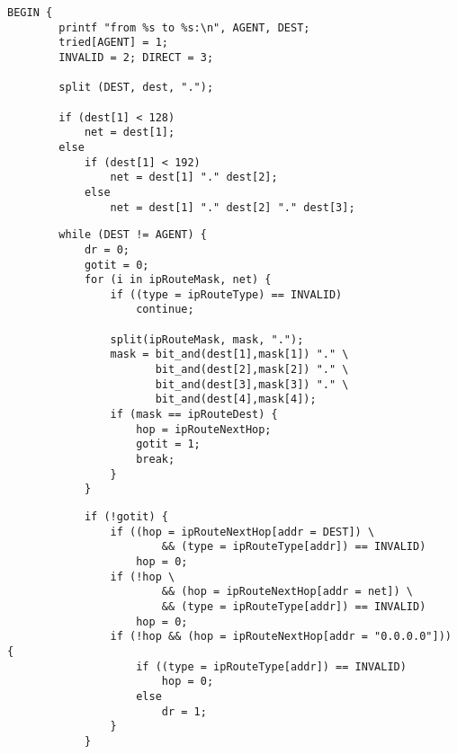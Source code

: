 \begin{bwslide}

\vspace{0.5in}
\smaller
\begin{verbatim}
BEGIN {
        printf "from %s to %s:\n", AGENT, DEST;
        tried[AGENT] = 1;
        INVALID = 2; DIRECT = 3;

        split (DEST, dest, ".");

        if (dest[1] < 128)
            net = dest[1];
        else
            if (dest[1] < 192)
                net = dest[1] "." dest[2];
            else
                net = dest[1] "." dest[2] "." dest[3];
\end{verbatim}
\end{bwslide}


\begin{bwslide}

\vspace{0.5in}
\smaller
\begin{verbatim}
        while (DEST != AGENT) {
            dr = 0;
            gotit = 0;
            for (i in ipRouteMask, net) {
                if ((type = ipRouteType) == INVALID)
                    continue;

                split(ipRouteMask, mask, ".");
                mask = bit_and(dest[1],mask[1]) "." \
                       bit_and(dest[2],mask[2]) "." \
                       bit_and(dest[3],mask[3]) "." \
                       bit_and(dest[4],mask[4]);
                if (mask == ipRouteDest) {
                    hop = ipRouteNextHop;
                    gotit = 1;
                    break;
                }
            }
\end{verbatim}
\end{bwslide}


\begin{bwslide}

\vspace{0.5in}
\smaller
\begin{verbatim}
            if (!gotit) {
                if ((hop = ipRouteNextHop[addr = DEST]) \
                        && (type = ipRouteType[addr]) == INVALID)
                    hop = 0;
                if (!hop \
                        && (hop = ipRouteNextHop[addr = net]) \
                        && (type = ipRouteType[addr]) == INVALID)
                    hop = 0;
                if (!hop && (hop = ipRouteNextHop[addr = "0.0.0.0"])) {
                    if ((type = ipRouteType[addr]) == INVALID)
                        hop = 0;
                    else
                        dr = 1;
                }
            }
\end{verbatim}
\end{bwslide}


